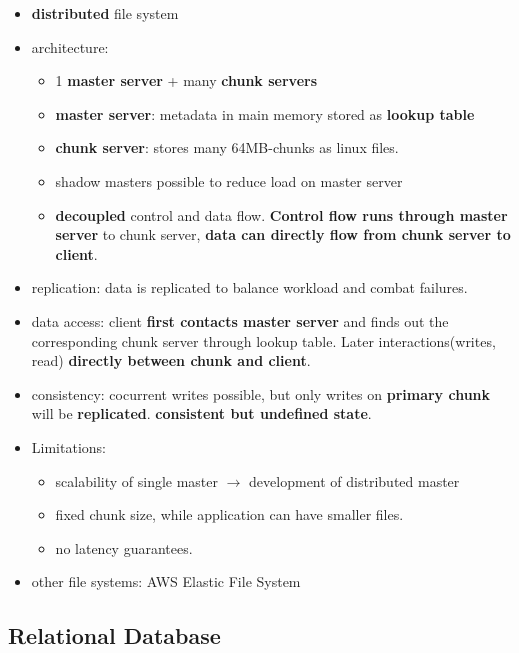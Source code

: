 \begin{itemize}
	\item \textbf{distributed} file system
	\item architecture:
	\begin{itemize}
		\item 1 \textbf{master server} + many \textbf{chunk servers}
		\item \textbf{master server}: metadata in main memory stored as \textbf{lookup table}
		\item \textbf{chunk server}: stores many 64MB-chunks as linux files.
		\item shadow masters possible to reduce load on master server
		\item \textbf{decoupled} control and data flow. \textbf{Control flow runs through master server} to chunk server, \textbf{data can directly flow from chunk server to client}.
	\end{itemize}
	\item replication: data is replicated to balance workload and combat failures.
	\item data access: client \textbf{first contacts master server} and finds out the corresponding chunk server through lookup table. Later interactions(writes, read) \textbf{directly between chunk and client}. 
	\item consistency: cocurrent writes possible, but only writes on \textbf{primary chunk} will be \textbf{replicated}. \textbf{consistent but undefined state}.
	\item Limitations:
	\begin{itemize}
		\item scalability of single master $\rightarrow$ development of distributed master
		\item fixed chunk size, while application can have smaller files.
		\item no latency guarantees.
	\end{itemize}
	\item other file systems: AWS Elastic File System
\end{itemize}

\subsection{Relational Database}


